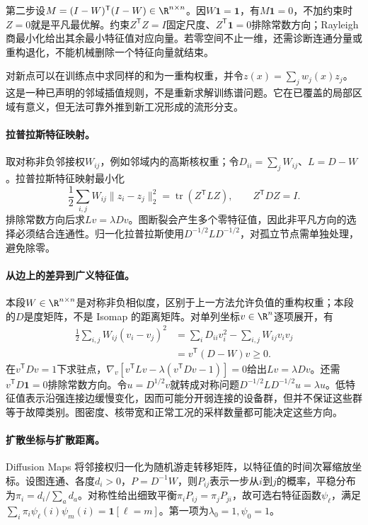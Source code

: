 第二步设$M=(I-W)^{\mathsf T}(I-W)\in\R^{n\times n}$。因$W\mathbf1=\mathbf1$，有$M\mathbf1=0$，不加约束时$Z=0$就是平凡最优解。约束$Z^{\mathsf T}Z=I$固定尺度、$Z^{\mathsf T}\mathbf1=0$排除常数方向；Rayleigh 商最小化给出其余最小特征值对应向量。若零空间不止一维，还需诊断连通分量或重构退化，不能机械删除一个特征向量就结束。

对新点可以在训练点中求同样的和为一重构权重，并令$z(x)=\sum_jw_j(x)z_j$。这是一种已声明的邻域插值规则，不是重新求解训练谱问题。它在已覆盖的局部区域有意义，但无法可靠外推到新工况形成的流形分支。

\paragraph{拉普拉斯特征映射。}
取对称非负邻接权$W_{ij}$，例如邻域内的高斯核权重；令$D_{ii}=\sum_jW_{ij}$、$L=D-W$。拉普拉斯特征映射最小化\cite{belkin2003laplacian}
\begin{equation}
 \frac12\sum_{i,j}W_{ij}\|z_i-z_j\|_2^2
 =\operatorname{tr}(Z^{\mathsf T}LZ),\qquad Z^{\mathsf T}DZ=I.
\end{equation}
排除常数方向后求$Lv=\lambda Dv$。图断裂会产生多个零特征值，因此非平凡方向的选择必须结合连通性。归一化拉普拉斯使用$D^{-1/2}LD^{-1/2}$，对孤立节点需单独处理，避免除零。

\paragraph{从边上的差异到广义特征值。}
本段$W\in\R^{n\times n}$是对称非负相似度，区别于上一方法允许负值的重构权重；本段的$D$是度矩阵，不是 Isomap 的距离矩阵。对单列坐标$v\in\R^n$逐项展开，有
\begin{align}
 \frac12\sum_{i,j}W_{ij}(v_i-v_j)^2
 &=\sum_iD_{ii}v_i^2-\sum_{i,j}W_{ij}v_iv_j\\
 &=v^{\mathsf T}(D-W)v\geq0.
\end{align}
在$v^{\mathsf T}Dv=1$下求驻点，$\nabla_v[v^{\mathsf T}Lv-\lambda(v^{\mathsf T}Dv-1)]=0$给出$Lv=\lambda Dv$。还需$v^{\mathsf T}D\mathbf1=0$排除常数方向。令$u=D^{1/2}v$就转成对称问题$D^{-1/2}LD^{-1/2}u=\lambda u$。低特征值表示沿强连接边缓慢变化，因而可能分开弱连接的设备群，但并不保证这些群等于故障类别。图密度、核带宽和正常工况的采样数量都可能决定这些方向。

\paragraph{扩散坐标与扩散距离。}
Diffusion Maps 将邻接权归一化为随机游走转移矩阵，以特征值的时间次幂缩放坐标\cite{coifman2006diffusion}。设图连通、各度$d_i>0$，$P=D^{-1}W$，则$P_{ij}$表示一步从$i$到$j$的概率，平稳分布为$\pi_i=d_i/\sum_ad_a$。对称性给出细致平衡$\pi_iP_{ij}=\pi_jP_{ji}$，故可选右特征函数$\psi_\ell$，满足$\sum_i\pi_i\psi_\ell(i)\psi_m(i)=\mathbf1[\ell=m]$。第一项为$\lambda_0=1,\psi_0=1$。

